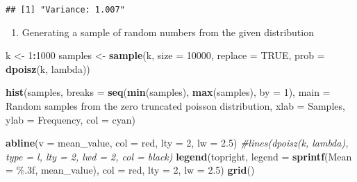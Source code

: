 \documentclass[
]{article}
\newenvironment{Shaded}{\begin{snugshade}}{\end{snugshade}}
\newcommand{\AttributeTok}[1]{\textcolor[rgb]{0.13,0.29,0.53}{#1}}
\newcommand{\CommentTok}[1]{\textcolor[rgb]{0.56,0.35,0.01}{\textit{#1}}}
\newcommand{\ConstantTok}[1]{\textcolor[rgb]{0.56,0.35,0.01}{#1}}
\newcommand{\DecValTok}[1]{\textcolor[rgb]{0.00,0.00,0.81}{#1}}
\newcommand{\FloatTok}[1]{\textcolor[rgb]{0.00,0.00,0.81}{#1}}
\newcommand{\FunctionTok}[1]{\textcolor[rgb]{0.13,0.29,0.53}{\textbf{#1}}}
\newcommand{\NormalTok}[1]{#1}
\newcommand{\OtherTok}[1]{\textcolor[rgb]{0.56,0.35,0.01}{#1}}
\newcommand{\SpecialCharTok}[1]{\textcolor[rgb]{0.81,0.36,0.00}{\textbf{#1}}}
\newcommand{\StringTok}[1]{\textcolor[rgb]{0.31,0.60,0.02}{#1}}
\providecommand{\tightlist}{%
  \setlength{\itemsep}{0pt}\setlength{\parskip}{0pt}}
\begin{document}
\begin{verbatim}
## [1] "Variance: 1.007"
\end{verbatim}

\begin{enumerate}
\def\labelenumi{\arabic{enumi})}
\setcounter{enumi}{3}
\tightlist
\item
  Generating a sample of random numbers from the given distribution
\end{enumerate}

\begin{Shaded}
\begin{Highlighting}[]
\NormalTok{k }\OtherTok{\textless{}{-}} \DecValTok{1}\SpecialCharTok{:}\DecValTok{1000}
\NormalTok{samples }\OtherTok{\textless{}{-}} \FunctionTok{sample}\NormalTok{(k, }\AttributeTok{size =} \DecValTok{10000}\NormalTok{, }\AttributeTok{replace =} \ConstantTok{TRUE}\NormalTok{, }\AttributeTok{prob =} \FunctionTok{dpoisz}\NormalTok{(k, lambda))}


\FunctionTok{hist}\NormalTok{(samples,}
     \AttributeTok{breaks =} \FunctionTok{seq}\NormalTok{(}\FunctionTok{min}\NormalTok{(samples), }\FunctionTok{max}\NormalTok{(samples), }\AttributeTok{by =} \DecValTok{1}\NormalTok{),}
     \AttributeTok{main =} \StringTok{\textquotesingle{}Random samples from the zero truncated poisson distribution\textquotesingle{}}\NormalTok{, }
     \AttributeTok{xlab =} \StringTok{\textquotesingle{}Samples\textquotesingle{}}\NormalTok{, }\AttributeTok{ylab =} \StringTok{\textquotesingle{}Frequency\textquotesingle{}}\NormalTok{, }
     \AttributeTok{col =} \StringTok{\textquotesingle{}cyan\textquotesingle{}}\NormalTok{)}


\FunctionTok{abline}\NormalTok{(}\AttributeTok{v =}\NormalTok{ mean\_value, }\AttributeTok{col =} \StringTok{\textquotesingle{}red\textquotesingle{}}\NormalTok{, }\AttributeTok{lty =} \DecValTok{2}\NormalTok{, }\AttributeTok{lw =} \FloatTok{2.5}\NormalTok{)}
\CommentTok{\#lines(dpoisz(k, lambda), type = \textquotesingle{}l\textquotesingle{}, lty = 2, lwd = 2, col = \textquotesingle{}black\textquotesingle{})}
\FunctionTok{legend}\NormalTok{(}\StringTok{\textquotesingle{}topright\textquotesingle{}}\NormalTok{, }\AttributeTok{legend =} \FunctionTok{sprintf}\NormalTok{(}\StringTok{\textquotesingle{}Mean = \%.3f\textquotesingle{}}\NormalTok{, mean\_value), }\AttributeTok{col =} \StringTok{\textquotesingle{}red\textquotesingle{}}\NormalTok{, }\AttributeTok{lty =} \DecValTok{2}\NormalTok{, }\AttributeTok{lw =} \FloatTok{2.5}\NormalTok{)}
\FunctionTok{grid}\NormalTok{()}
\end{Highlighting}
\end{Shaded}
\end{document}
